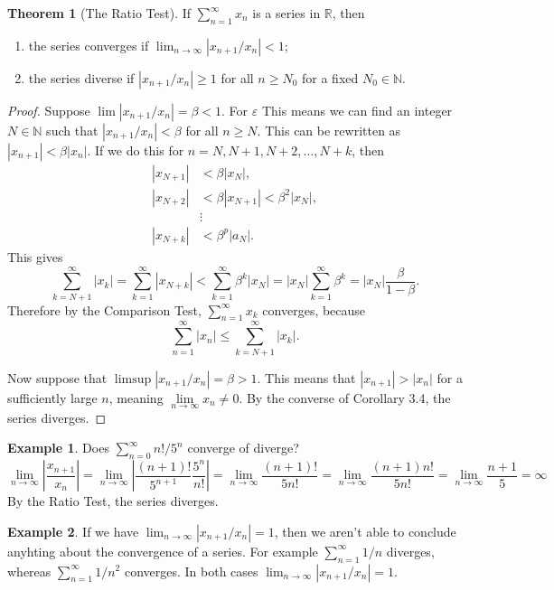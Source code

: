 \documentclass{article}
\newcommand{\N}{\mathbb{N}}
\newcommand{\R}{\mathbb{R}}
\theoremstyle{definition}
\newtheorem{theorem}{Theorem}[section]
\newtheorem{example}{Example}[section]
\begin{document}
	\begin{theorem}[The Ratio Test]
		If $ \sum_{n=1}^{\infty}x_n  $ is a series in $ \R $, then
		\begin{enumerate}
			\item the series converges if $ \lim_{n\to\infty}|x_{n+1}/x_n|<1 $;
			\item the series diverse if $ |x_{n+1}/x_n|\ge 1 $ for all $ n\ge N_0 $ for a fixed $ N_0\in\N $.
		\end{enumerate} 
	\end{theorem}
	\begin{proof}
		Suppose $ \lim |x_{n+1}/x_n|=\beta<1 $. For $ \varepsilon $ This means we can find an integer $ N\in\N $ such that $|x_{n+1}/x_n|<\beta $ for all $ n\ge N $. This can be rewritten as $ |x_{n+1}|<\beta|x_n| $. If we do this for $ n=N,N+1,N+2,\ldots ,N+k $, then \begin{align*}
			|x_{N+1}|&<\beta|x_N|,\\
			|x_{N+2}|&<\beta|x_{N+1}|<\beta^2|x_{N}|,\\
			&\vdots\\
			|x_{N+k}|&<\beta^p|a_N|.
		\end{align*}
		This gives $$ \sum_{k=N+1}^{\infty}|x_k|=\sum_{k=1}^{\infty}|x_{N+k}|<\sum_{k=1}^{\infty}\beta^k|x_N|=|x_N|\sum_{k=1}^\infty \beta ^k=|x_N|\frac{\beta}{1-\beta}.$$	Therefore by the Comparison Test, $ \sum_{n=1}^{\infty}x_k $ converges, because $$ \sum_{n=1}^{\infty}|x_n|\le\sum_{k=N+1}^{\infty}|x_k|.$$
		
		Now suppose that $ \limsup|x_{n+1}/x_n|=\beta>1 $. This means that $ |x_{n+1}|>|x_n| $ for a sufficiently large $ n $, meaning $ \lim\limits_{n\to\infty}x_n\neq 0 $. By the converse of Corollary 3.4, the series diverges.  
	\end{proof}
	\begin{example}
		Does $ \sum_{n=0}^{\infty}n!/5^n $ converge of diverge? 
		$$\lim\limits_{n\to\infty}\left\lvert \frac{x_{n+1}}{x_n}\right\rvert=\lim\limits_{n\to\infty}\left\lvert \frac{(n+1)!}{5^{n+1}}\frac{5^n}{n!}\right\rvert=\lim\limits_{n\to\infty}\frac{(n+1)!}{5n!}=\lim\limits_{n\to\infty}\frac{(n+1)n!}{5n!}=\lim\limits_{n\to\infty}\frac{n+1}{5}=\infty$$ By the Ratio Test, the series diverges. 
	\end{example}
	\begin{example}
		If we have $ \lim_{n\to\infty}|x_{n+1}/x_n|=1 $, then we aren't able to conclude anyhting about the convergence of a series. For example $ \sum_{n=1}^{\infty}1/n $ diverges, whereas  $ \sum_{n=1}^{\infty}1/n^2 $ converges. In both cases $ \lim_{n\to\infty}|x_{n+1}/x_n|=1 $. 	
	\end{example}
\end{document}
